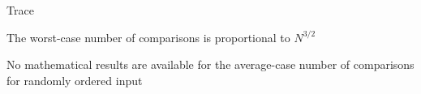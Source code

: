 \documentclass[8pt,a4paper,compress]{beamer}
\begin{document}
\begin{frame}[fragile]
\pause

Trace
\begin{center}
\end{center}
\end{frame}

\begin{frame}[fragile]
\pause

The worst-case number of comparisons is proportional to $N^{3/2}$

\pause
\bigskip

No mathematical results are available for the average-case number of comparisons for randomly ordered input
\end{frame}
\end{document}
